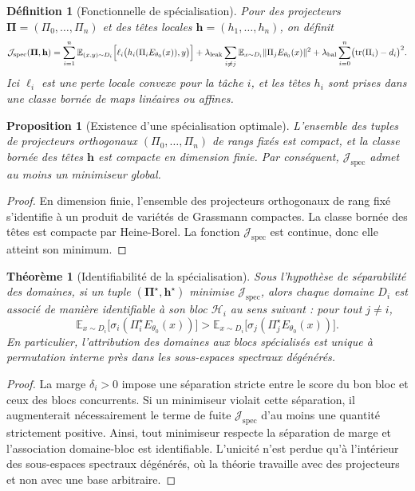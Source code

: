 \documentclass[11pt,a4paper]{article}
\newtheorem{definition}{Définition}[section]
\newtheorem{proposition}{Proposition}[section]
\newtheorem{theorem}{Théorème}[section]
\newcommand{\Hh}{\mathcal H}
\newcommand{\1}{\mathbf 1}
\begin{document}
\begin{definition}[Fonctionnelle de spécialisation]
Pour des projecteurs \(\mathbf \Pi=(\Pi_0,\dots,\Pi_n)\) et des têtes locales \(\mathbf h=(h_1,\dots,h_n)\), on définit
\[
\mathcal J_{\mathrm{spec}}(\mathbf\Pi,\mathbf h)
=
\sum_{i=1}^n
\mathbb E_{(x,y)\sim D_i}
\Bigl[
\ell_i\bigl(h_i(\Pi_i E_{\theta_0}(x)),y\bigr)
\Bigr]
+
\lambda_{\mathrm{leak}}
\sum_{i\neq j}
\mathbb E_{x\sim D_i}\|\Pi_j E_{\theta_0}(x)\|^2
+
\lambda_{\mathrm{bal}}
\sum_{i=0}^n
\bigl(\operatorname{tr}(\Pi_i)-d_i\bigr)^2.
\]
Ici \(\ell_i\) est une perte locale convexe pour la tâche \(i\), et les têtes \(h_i\) sont prises dans une classe bornée de maps linéaires ou affines.
\end{definition}

\begin{proposition}[Existence d'une spécialisation optimale]
L'ensemble des tuples de projecteurs orthogonaux \((\Pi_0,\dots,\Pi_n)\) de rangs fixés est compact, et la classe bornée des têtes \(\mathbf h\) est compacte en dimension finie.  
Par conséquent, \(\mathcal J_{\mathrm{spec}}\) admet au moins un minimiseur global.
\end{proposition}

\begin{proof}
En dimension finie, l'ensemble des projecteurs orthogonaux de rang fixé s'identifie à un produit de variétés de Grassmann compactes.  
La classe bornée des têtes est compacte par Heine-Borel.  
La fonction \(\mathcal J_{\mathrm{spec}}\) est continue, donc elle atteint son minimum.
\end{proof}

\begin{theorem}[Identifiabilité de la spécialisation]
Sous l'hypothèse de séparabilité des domaines, si un tuple \((\mathbf \Pi^\star,\mathbf h^\star)\) minimise \(\mathcal J_{\mathrm{spec}}\), alors chaque domaine \(D_i\) est associé de manière identifiable à son bloc \(\Hh_i\) au sens suivant :
pour tout \(j\neq i\),
\[
\mathbb E_{x\sim D_i}\bigl[\sigma_i(\Pi_i^\star E_{\theta_0}(x))\bigr]
>
\mathbb E_{x\sim D_i}\bigl[\sigma_j(\Pi_j^\star E_{\theta_0}(x))\bigr].
\]
En particulier, l'attribution des domaines aux blocs spécialisés est unique à permutation interne près dans les sous-espaces spectraux dégénérés.
\end{theorem}

\begin{proof}
La marge \(\delta_i>0\) impose une séparation stricte entre le score du bon bloc et ceux des blocs concurrents.  
Si un minimiseur violait cette séparation, il augmenterait nécessairement le terme de fuite \(\mathcal J_{\mathrm{spec}}\) d'au moins une quantité strictement positive.  
Ainsi, tout minimiseur respecte la séparation de marge et l'association domaine-bloc est identifiable.  
L'unicité n'est perdue qu'à l'intérieur des sous-espaces spectraux dégénérés, où la théorie travaille avec des projecteurs et non avec une base arbitraire.
\end{proof}
\end{document}
